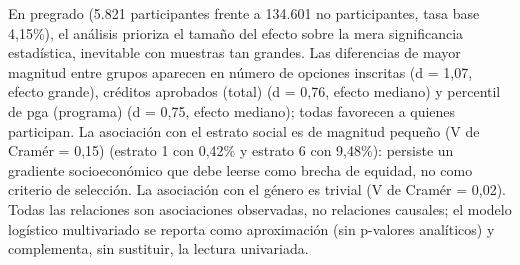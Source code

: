 En pregrado (5.821 participantes frente a 134.601 no participantes, tasa base 4,15\%), el análisis prioriza el tamaño del efecto sobre la mera significancia estadística, inevitable con muestras tan grandes. Las diferencias de mayor magnitud entre grupos aparecen en número de opciones inscritas (d = 1,07, efecto grande), créditos aprobados (total) (d = 0,76, efecto mediano) y percentil de pga (programa) (d = 0,75, efecto mediano); todas favorecen a quienes participan. La asociación con el estrato social es de magnitud pequeño (V de Cramér = 0,15) (estrato 1 con 0,42\% y estrato 6 con 9,48\%): persiste un gradiente socioeconómico que debe leerse como brecha de equidad, no como criterio de selección. La asociación con el género es trivial (V de Cramér = 0,02). Todas las relaciones son asociaciones observadas, no relaciones causales; el modelo logístico multivariado se reporta como aproximación (sin p-valores analíticos) y complementa, sin sustituir, la lectura univariada.
